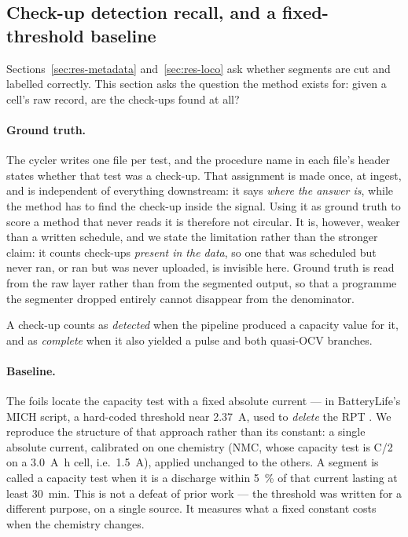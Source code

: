 \documentclass[preprint,3p,number]{elsarticle}
\begin{document}
\subsection{Check-up detection recall, and a fixed-threshold baseline}
\label{sec:res-recall}

Sections~\ref{sec:res-metadata} and~\ref{sec:res-loco} ask whether segments are
cut and labelled correctly. This section asks the question the method exists for:
given a cell's raw record, are the check-ups found at all?

\paragraph{Ground truth.} The cycler writes one file per test, and the procedure
name in each file's header states whether that test was a check-up. That
assignment is made once, at ingest, and is independent of everything downstream:
it says \emph{where the answer is}, while the method has to find the check-up
inside the signal. Using it as ground truth to score a method that never reads
it is therefore not circular. It is, however, weaker than a written schedule,
and we state the limitation rather than the stronger claim: it counts check-ups
\emph{present in the data}, so one that was scheduled but never ran, or ran but
was never uploaded, is invisible here. Ground truth is read from the raw layer
rather than from the segmented output, so that a programme the segmenter dropped
entirely cannot disappear from the denominator.

A check-up counts as \emph{detected} when the pipeline produced a capacity value
for it, and as \emph{complete} when it also yielded a pulse and both quasi-OCV
branches.

\paragraph{Baseline.} The foils locate the capacity test with a fixed absolute
current --- in BatteryLife's MICH script, a hard-coded threshold near
\SI{2.37}{\ampere}, used to \emph{delete} the RPT \cite{batterylife}. We
reproduce the structure of that approach rather than its constant: a single
absolute current, calibrated on one chemistry (NMC, whose capacity test is C/2
on a \SI{3.0}{\ampere\hour} cell, i.e.\ \SI{1.5}{\ampere}), applied unchanged to
the others. A segment is called a capacity test when it is a discharge within
\SI{5}{\percent} of that current lasting at least \SI{30}{\minute}. This is not
a defeat of prior work --- the threshold was written for a different purpose, on
a single source. It measures what a fixed constant costs when the chemistry
changes.
\end{document}
